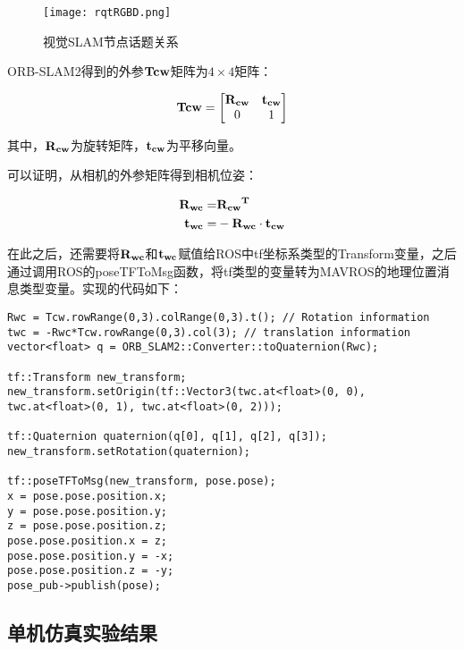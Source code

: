 \begin{figure}[!ht]
	\centering
	\texttt{[image: rqtRGBD.png]}
	\caption{视觉SLAM节点话题关系}
	\label{fig4-5}
\end{figure}

ORB-SLAM2得到的外参$\bf{Tcw}$矩阵为$4 \times 4$矩阵：

\begin{equation}
\bf{Tcw}=\begin{bmatrix}
\bf{R_{cw}} & \bf{t_{cw}}\\0 & 1
\end{bmatrix}
\end{equation}

其中，$\bf{R_{cw}}$为旋转矩阵，$\bf{t_{cw}}$为平移向量。

可以证明，从相机的外参矩阵得到相机位姿：

\begin{equation}
\begin{aligned}
\bf{R_{wc}}= &\bf{R_{cw}}^T\\
\bf{t_{wc}}= &-\bf{R_{wc}} \cdot  \bf{t_{cw}}
\end{aligned}
\end{equation}

在此之后，还需要将$\bf{R_{wc}}$和$\bf{t_{wc}}$赋值给ROS中tf坐标系类型的Transform变量，之后通过调用ROS的poseTFToMsg函数，将tf类型的变量转为MAVROS的地理位置消息类型变量。实现的代码如下：

\begin{verbatim}
Rwc = Tcw.rowRange(0,3).colRange(0,3).t(); // Rotation information
twc = -Rwc*Tcw.rowRange(0,3).col(3); // translation information
vector<float> q = ORB_SLAM2::Converter::toQuaternion(Rwc);

tf::Transform new_transform;
new_transform.setOrigin(tf::Vector3(twc.at<float>(0, 0), 
twc.at<float>(0, 1), twc.at<float>(0, 2)));

tf::Quaternion quaternion(q[0], q[1], q[2], q[3]);
new_transform.setRotation(quaternion);

tf::poseTFToMsg(new_transform, pose.pose);
x = pose.pose.position.x;
y = pose.pose.position.y;
z = pose.pose.position.z;
pose.pose.position.x = z;
pose.pose.position.y = -x;
pose.pose.position.z = -y;
pose_pub->publish(pose);
\end{verbatim}

\subsection{单机仿真实验结果} \label{4.2.4}

